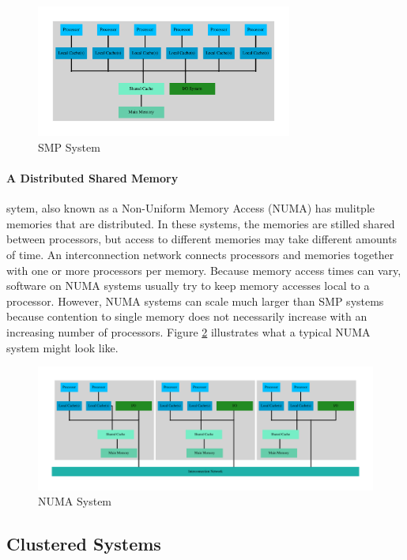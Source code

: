 \documentclass[11pt]{book}
\begin{document}
\begin{figure}[H]
    \centering
    \includegraphics[width=0.75\textwidth]{figs/graphviz/smp.pdf}
    \caption{SMP System}\label{smp}
\end{figure}

\paragraph{A Distributed Shared Memory} sytem, also known as a Non-Uniform Memory Access
(NUMA) has mulitple memories that are distributed. In these systems, the memories are stilled
shared between processors, but access to different memories may take different amounts
of time. An interconnection network connects processors and memories together with one or
more processors per memory. Because memory access times can vary, software on NUMA systems
usually try to keep memory accesses local to a processor. However, NUMA systems can scale
much larger than SMP systems because contention to single memory does not necessarily increase
with an increasing number of processors. Figure \ref{distributed} illustrates what a typical
NUMA system might look like.

\begin{figure}[H]
    \centering
    \includegraphics[width=\textwidth]{figs/graphviz/distributed.pdf}
    \caption{NUMA System}\label{distributed}
\end{figure}

\subsection{Clustered Systems}
\end{document}
